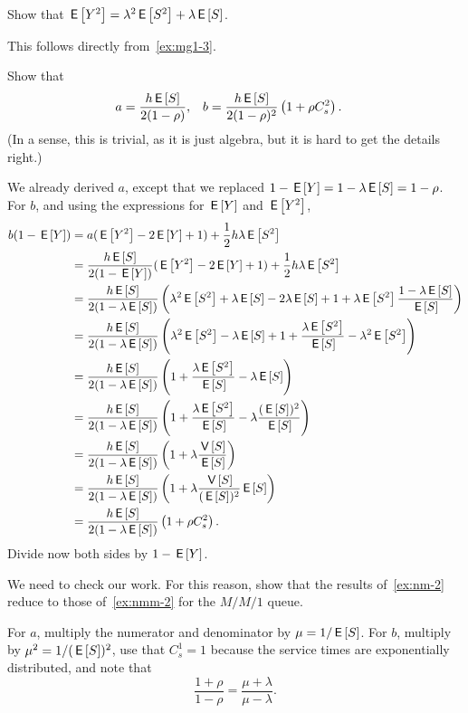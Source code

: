 \documentclass[companion]{subfiles}
\begin{document}
\begin{extra}
  Show that $\E{Y^2} = \lambda^2 \E{S^2} + \lambda \E S$. 
\begin{solution}
This follows directly from~\cref{ex:mg1-3}.
\end{solution}
\end{extra}

\begin{exercise}
Show that 
\begin{align*}
  a &= \frac{h \E S}{2(1-\rho)}, &
  b &= \frac{h \E S}{2(1-\rho)^2} \left( 1+ \rho C_s^2\right).
\end{align*}
(In a sense, this is trivial, as it is just algebra, but it is hard to get the details right.)
\begin{solution}
  We already derived $a$, except that we replaced $1-\E Y= 1-\lambda \E S = 1-\rho$. 
For $b$, and using the expressions for $\E Y$ and $\E{Y^2}$, 
\begin{align*}
b(1-\E Y) &= a(\E{Y^2} - 2 \E Y + 1) + \frac 12 h \lambda \E{S^2} \\
&= \frac{h \E S}{2(1-\E Y)} (\E{Y^2} - 2 \E Y + 1) + \frac 12 h \lambda \E{S^2} \\
&= \frac{h \E S}{2(1-\lambda \E S)} \left(\lambda^2 \E{S^2} + \lambda \E S - 2 \lambda \E S + 1 +  \lambda \E{S^2}\frac{1-\lambda \E S}{\E S}\right) \\
&= \frac{h \E S}{2(1-\lambda \E S)} \left(\lambda^2 \E{S^2} - \lambda \E S + 1 +  \frac{\lambda \E{S^2}}{\E S} - \lambda^2 \E{S^2}\right) \\
&= \frac{h \E S}{2(1-\lambda \E S)} \left(1+ \frac{\lambda \E{S^2}}{\E S }  - \lambda \E S \right) \\
&= \frac{h \E S}{2(1-\lambda \E S)} \left( 1+ \frac{\lambda \E{S^2}}{\E S }  - \lambda \frac{(\E S)^2}{\E S}\right) \\
&= \frac{h \E S}{2(1-\lambda \E S)} \left( 1+ \lambda \frac{\V{S}}{\E S }\right)\\
&= \frac{h \E S}{2(1-\lambda \E S)} \left( 1+ \lambda \frac{\V{S}}{(\E S)^2 } \E S\right)\\
&= \frac{h \E S}{2(1-\lambda \E S)} \left( 1+ \rho C_s^2\right).
\end{align*}
Divide now both sides by $1-\E Y$. 
\end{solution}
\end{exercise}

\begin{extra}
We need to check our work.  For this reason, show that the results of~\cref{ex:nm-2} reduce to those of~\cref{ex:nmm-2} for the $M/M/1$ queue. 
\begin{solution}
  For $a$, multiply the numerator and denominator by $\mu=1/ \E S$.
  For $b$, multiply by $\mu^2 = 1/(\E S)^2$, use that $C_s^1=1$ because the service times are exponentially distributed, and note that
  \begin{equation*}
    \frac{1+\rho}{1-\rho} = \frac{\mu + \lambda}{\mu-\lambda}.
  \end{equation*}
\end{solution}
\end{extra}
\end{document}
